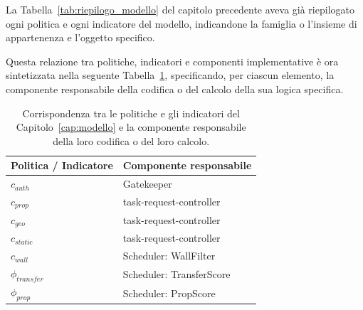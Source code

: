 La Tabella~\ref{tab:riepilogo_modello} del capitolo precedente aveva già riepilogato ogni politica e ogni indicatore del modello, indicandone la famiglia o l'insieme di appartenenza e l'oggetto specifico. 

Questa relazione tra politiche, indicatori e componenti implementative è ora sintetizzata nella seguente Tabella~\ref{tab:riepilogo_implementazione}, specificando, per ciascun elemento, la componente responsabile della codifica o del calcolo della sua logica specifica.

\begin{table}[htb]
    \centering
    \begin{tabular}{ll}
        \toprule
        \textbf{Politica / Indicatore} & \textbf{Componente responsabile} \\
        \midrule
        $c_{auth}$        & Gatekeeper \\
        $c_{prop}$        & task-request-controller \\
        $c_{geo}$         & task-request-controller \\
        $c_{static}$      & task-request-controller \\
        $c_{wall}$        & Scheduler: WallFilter \\
        \midrule
        $\phi_{transfer}$ & Scheduler: TransferScore \\
        $\phi_{prop}$     & Scheduler: PropScore \\
        \bottomrule
    \end{tabular}
    \caption{Corrispondenza tra le politiche e gli indicatori del Capitolo~\ref{cap:modello} e la componente responsabile della loro codifica o del loro calcolo.}
    \label{tab:riepilogo_implementazione}
\end{table}